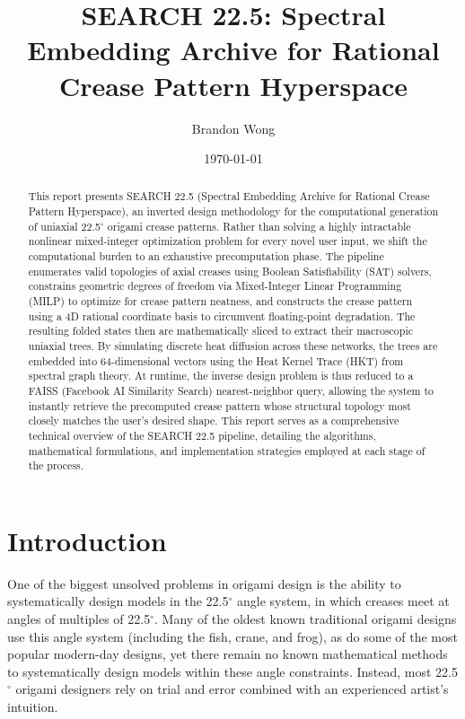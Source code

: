 \documentclass[11pt]{article}
\title{\textbf{SEARCH 22.5: Spectral Embedding Archive for Rational Crease Pattern Hyperspace}}
\author{Brandon Wong}
\date{\today}
\begin{document}
\maketitle

\begin{abstract}
This report presents SEARCH 22.5 (Spectral Embedding Archive for Rational Crease Pattern Hyperspace), an inverted design methodology for the computational generation of uniaxial 22.5$^\circ$ origami crease patterns. Rather than solving a highly intractable nonlinear mixed-integer optimization problem for every novel user input, we shift the computational burden to an exhaustive precomputation phase. The pipeline enumerates valid topologies of axial creases using Boolean Satisfiability (SAT) solvers, constrains geometric degrees of freedom via Mixed-Integer Linear Programming (MILP) to optimize for crease pattern neatness, and constructs the crease pattern using a 4D rational coordinate basis to circumvent floating-point degradation. The resulting folded states then are mathematically sliced to extract their macroscopic uniaxial trees. By simulating discrete heat diffusion across these networks, the trees are embedded into 64-dimensional vectors using the Heat Kernel Trace (HKT) from spectral graph theory. At runtime, the inverse design problem is thus reduced to a FAISS (Facebook AI Similarity Search) nearest-neighbor query, allowing the system to instantly retrieve the precomputed crease pattern whose structural topology most closely matches the user's desired shape. This report serves as a comprehensive technical overview of the SEARCH 22.5 pipeline, detailing the algorithms, mathematical formulations, and implementation strategies employed at each stage of the process.
\end{abstract}


\section*{Introduction}

One of the biggest unsolved problems in origami design is the ability to systematically design models in the 22.5$^\circ$ angle system, in which creases meet at angles of multiples of 22.5$^\circ$. Many of the oldest known traditional origami designs use this angle system (including the fish, crane, and frog), as do some of the most popular modern-day designs, yet there remain no known mathematical methods to systematically design models within these angle constraints. Instead, most 22.5$^\circ$ origami designers rely on trial and error combined with an experienced artist's intuition.
\end{document}
